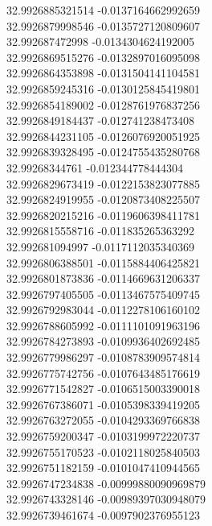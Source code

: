 {32.9926885321514	-0.0137164662992659\\
32.9926879998546	-0.0135727120809607\\
32.992687472998	-0.0134304624192005\\
32.9926869515276	-0.0132897016095098\\
32.9926864353898	-0.0131504141104581\\
32.9926859245316	-0.0130125845419801\\
32.9926854189002	-0.0128761976837256\\
32.9926849184437	-0.012741238473408\\
32.9926844231105	-0.0126076920051925\\
32.9926839328495	-0.0124755435280768\\
32.99268344761	-0.012344778444304\\
32.9926829673419	-0.0122153823077885\\
32.9926824919955	-0.0120873408225507\\
32.9926820215216	-0.0119606398411781\\
32.9926815558716	-0.011835265363292\\
32.992681094997	-0.0117112035340369\\
32.9926806388501	-0.0115884406425821\\
32.9926801873836	-0.0114669631206337\\
32.9926797405505	-0.0113467575409745\\
32.9926792983044	-0.0112278106160102\\
32.9926788605992	-0.0111101091963196\\
32.9926784273893	-0.0109936402692485\\
32.9926779986297	-0.0108783909574814\\
32.9926775742756	-0.0107643485176619\\
32.9926771542827	-0.0106515003390018\\
32.9926767386071	-0.0105398339419205\\
32.9926763272055	-0.0104293369766838\\
32.9926759200347	-0.0103199972220737\\
32.9926755170523	-0.0102118025840503\\
32.9926751182159	-0.0101047410944565\\
32.9926747234838	-0.00999880090969879\\
32.9926743328146	-0.00989397030948079\\
32.9926739461674	-0.0097902376955123\\
}
